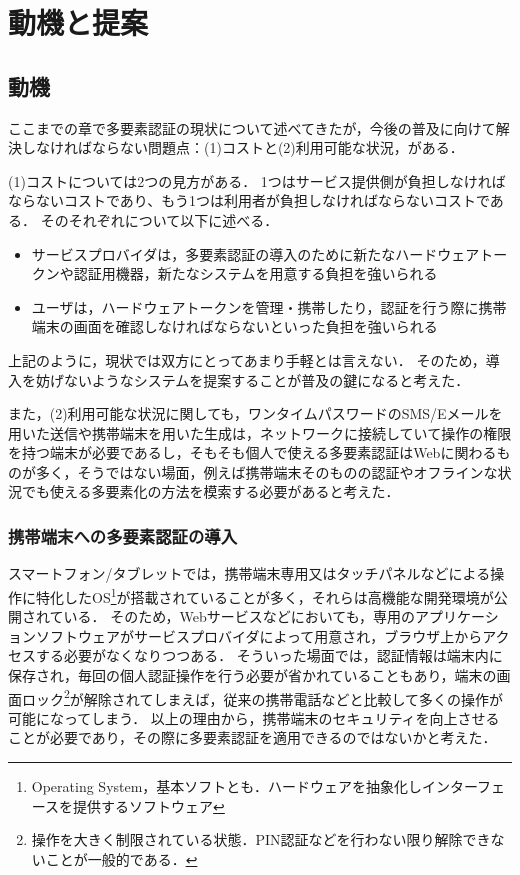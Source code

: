 \chapter{動機と提案}\label{chap:motive}
\section{動機}\label{sec:motive}
ここまでの章で多要素認証の現状について述べてきたが，今後の普及に向けて解決しなければならない問題点：(1)コストと(2)利用可能な状況，がある．

(1)コストについては2つの見方がある．
1つはサービス提供側が負担しなければならないコストであり、もう1つは利用者が負担しなければならないコストである．
そのそれぞれについて以下に述べる．
\begin{itemize}
  \item サービスプロバイダは，多要素認証の導入のために新たなハードウェアトークンや認証用機器，新たなシステムを用意する負担を強いられる
  \item ユーザは，ハードウェアトークンを管理・携帯したり，認証を行う際に携帯端末の画面を確認しなければならないといった負担を強いられる
\end{itemize}
上記のように，現状では双方にとってあまり手軽とは言えない．
そのため，導入を妨げないようなシステムを提案することが普及の鍵になると考えた．

また，(2)利用可能な状況に関しても，ワンタイムパスワードのSMS/Eメールを用いた送信や携帯端末を用いた生成は，ネットワークに接続していて操作の権限を持つ端末が必要であるし，そもそも個人で使える多要素認証はWebに関わるものが多く，そうではない場面，例えば携帯端末そのものの認証やオフラインな状況でも使える多要素化の方法を模索する必要があると考えた．

\subsection{携帯端末への多要素認証の導入}
スマートフォン/タブレットでは，携帯端末専用又はタッチパネルなどによる操作に特化したOS\footnote{Operating System，基本ソフトとも．ハードウェアを抽象化しインターフェースを提供するソフトウェア}が搭載されていることが多く，それらは高機能な開発環境が公開されている．
そのため，Webサービスなどにおいても，専用のアプリケーションソフトウェアがサービスプロバイダによって用意され，ブラウザ上からアクセスする必要がなくなりつつある．
そういった場面では，認証情報は端末内に保存され，毎回の個人認証操作を行う必要が省かれていることもあり，端末の画面ロック\footnote{操作を大きく制限されている状態．PIN認証などを行わない限り解除できないことが一般的である．}が解除されてしまえば，従来の携帯電話などと比較して多くの操作が可能になってしまう．
以上の理由から，携帯端末のセキュリティを向上させることが必要であり，その際に多要素認証を適用できるのではないかと考えた．

